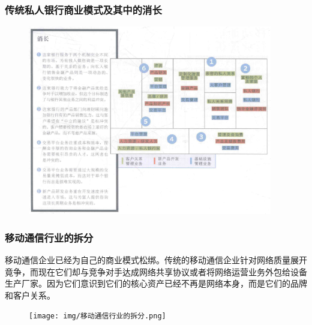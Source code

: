     \subsubsection{传统私人银行商业模式及其中的消长}
    \begin{figure}[H]
		\centering
        \vspace{-0.5em}
		\includegraphics[width=0.95\textwidth]{img/传统私人银行商业模式及其中的消长.png}
        \vspace{-0.5em}
	\end{figure}


    \subsubsection{移动通信行业的拆分}
    移动通信企业已经为自己的商业模式松绑。传统的移动通信企业针对网络质量展开竟争，而现在它们却与竞争对手达成网络共享协议或者将网络运营业务外包给设备生产厂家。因为它们意识到它们的核心资产已经不再是网络本身，而是它们的品牌和客户关系。
    \begin{figure}[H]
		\centering
        \vspace{-0.5em}
		\texttt{[image: img/移动通信行业的拆分.png]}
        \vspace{-0.5em}
	\end{figure}

